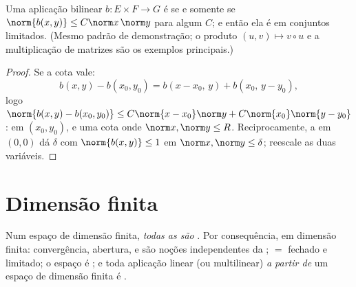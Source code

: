 \begin{proposition}\label{prop:b2:nvs:bilinear}
Uma aplicação bilinear $b \colon E \times F \to G$ é  se e somente se
$\norm{b(x,y)} \leq C\norm x\,\norm y$ para algum $C$; e então ela é
 em conjuntos limitados. (Mesmo padrão de demonstração; o produto
$(u, v) \mapsto v \circ u$ e a multiplicação de matrizes são os exemplos
principais.)
\end{proposition}

\begin{proof}
Se a cota vale:
\[
b(x,y) - b(x_0,y_0) = b(x - x_0,\, y) + b(x_0,\, y - y_0),
\]
logo $\norm{b(x,y) - b(x_0,y_0)} \leq C\norm{x - x_0}\norm y +
C\norm{x_0}\norm{y - y_0}$:  em $(x_0, y_0)$, e uma
cota  onde $\norm x, \norm y \leq R$. Reciprocamente, a
 em $(0,0)$ dá $\delta$ com $\norm{b(x,y)} \leq 1$ em
$\norm x, \norm y \leq \delta$; reescale as duas variáveis.
\end{proof}

\section{Dimensão finita}

\begin{theorem}\label{thm:b2:nvs:finitedim}
Num espaço de dimensão finita, \emph{todas as  são
}. Por consequência, em dimensão
finita: convergência, abertura,  e  são
noções independentes da ;  $=$ fechado e limitado;
o espaço é ; e toda aplicação linear (ou multilinear)
\emph{a partir de} um espaço de dimensão finita é .
\end{theorem}

